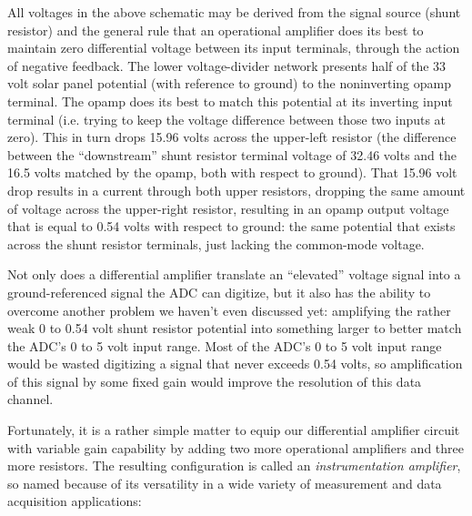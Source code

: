 All voltages in the above schematic may be derived from the signal source (shunt resistor) and the general rule that an operational amplifier does its best to maintain zero differential voltage between its input terminals, through the action of negative feedback.  The lower voltage-divider network presents half of the 33 volt solar panel potential (with reference to ground) to the noninverting opamp terminal.  The opamp does its best to match this potential at its inverting input terminal (i.e. trying to keep the voltage difference between those two inputs at zero).  This in turn drops 15.96 volts across the upper-left resistor (the difference between the ``downstream'' shunt resistor terminal voltage of 32.46 volts and the 16.5 volts matched by the opamp, both with respect to ground).  That 15.96 volt drop results in a current through both upper resistors, dropping the same amount of voltage across the upper-right resistor, resulting in an opamp output voltage that is equal to 0.54 volts with respect to ground: the same potential that exists across the shunt resistor terminals, just lacking the common-mode voltage.

\vskip 10pt

Not only does a differential amplifier translate an ``elevated'' voltage signal into a ground-referenced signal the ADC can digitize, but it also has the ability to overcome another problem we haven't even discussed yet: amplifying the rather weak 0 to 0.54 volt shunt resistor potential into something larger to better match the ADC's 0 to 5 volt input range.  Most of the ADC's 0 to 5 volt input range would be wasted digitizing a signal that never exceeds 0.54 volts, so amplification of this signal by some fixed gain would improve the resolution of this data channel.

\filbreak

Fortunately, it is a rather simple matter to equip our differential amplifier circuit with variable gain capability by adding two more operational amplifiers and three more resistors.  The resulting configuration is called an \textit{instrumentation amplifier}, so named because of its versatility in a wide variety of measurement and data acquisition applications:    

